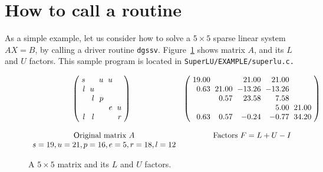 
\section{How to call a {\SuperLU} routine}
As a simple example, let us consider how to solve
a $5\times 5$ sparse linear system $AX=B$, by calling a driver
routine {\tt dgssv}. Figure~\ref{5x5} shows matrix $A$, and its $L$ and $U$
factors. This sample program is located in {\tt SuperLU/EXAMPLE/superlu.c.}

\begin{figure}[t]
  \newcommand{\s}{\space}
  \newcommand{\x}{\bullet}
  \newcommand{\f}{\circ}
  \begin{displaymath}
  \begin{array}{cc}
{\arraycolsep=3pt
\left(
\begin{array}{rrrrr}
s  	& \s 	& u 	& u 	& \s \\
l  	& u  	& \s 	& \s 	& \s \\
\s 	& l 	& p  	& \s 	& \s \\
\s 	& \s 	& \s 	& e  	& u \\
l 	& l 	& \s 	& \s 	& r 
\end{array}
\right)  }  \:\:\: &
{\arraycolsep=3pt
\left(
\begin{array}{rrrrr}
19.00  	& \s 	& 21.00 & 21.00	& \s \\
0.63 	& 21.00	& -13.26& -13.26& \s \\
\s 	& 0.57 	& 23.58	& 7.58 	& \s \\
\s 	& \s 	& \s 	& 5.00 	& 21.00 \\
0.63 	& 0.57 	& -0.24	& -0.77	& 34.20
\end{array}
\right)  }  \\ 
\: & \: \\
\mbox{Original matrix $A$} 	& \mbox{Factors $F=L+U-I$} \\
    s = 19, u = 21, p = 16, e = 5, r = 18, l = 12  & \\
  \end{array}
  \end{displaymath}
\vspace*{-0.2in}
\caption{A $5\times 5$ matrix and its $L$ and $U$ factors.}
\label{5x5}
\end{figure}


